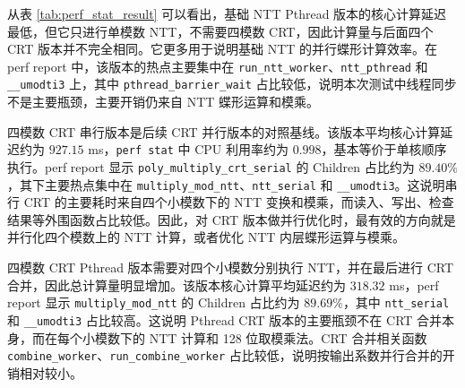 \documentclass[a4paper]{article}
\begin{document}
\begin{table}[htbp]
  \centering
  \caption{串行与并行版本在大规模样例上的 perf 统计结果}
  \label{tab:perf_stat_result}
\end{table}

从表 \ref{tab:perf_stat_result} 可以看出，基础 NTT Pthread 版本的核心计算延迟最低，但它只进行单模数 NTT，不需要四模数 CRT，因此计算量与后面四个 CRT 版本并不完全相同。它更多用于说明基础 NTT 的并行蝶形计算效率。在 perf report 中，该版本的热点主要集中在 \texttt{run\_ntt\_worker}、\texttt{ntt\_pthread} 和 \texttt{\_\_umodti3} 上，其中 \texttt{pthread\_barrier\_wait} 占比较低，说明本次测试中线程同步不是主要瓶颈，主要开销仍来自 NTT 蝶形运算和模乘。

四模数 CRT 串行版本是后续 CRT 并行版本的对照基线。该版本平均核心计算延迟约为 $927.15$ ms，\texttt{perf stat} 中 CPU 利用率约为 $0.998$，基本等价于单核顺序执行。perf report 显示 \texttt{poly\_multiply\_crt\_serial} 的 Children 占比约为 $89.40\%$，其下主要热点集中在 \texttt{multiply\_mod\_ntt}、\texttt{ntt\_serial} 和 \texttt{\_\_umodti3}。这说明串行 CRT 的主要耗时来自四个小模数下的 NTT 变换和模乘，而读入、写出、检查结果等外围函数占比较低。因此，对 CRT 版本做并行优化时，最有效的方向就是并行化四个模数上的 NTT 计算，或者优化 NTT 内层蝶形运算与模乘。

四模数 CRT Pthread 版本需要对四个小模数分别执行 NTT，并在最后进行 CRT 合并，因此总计算量明显增加。该版本核心计算平均延迟约为 $318.32$ ms，perf report 显示 \texttt{multiply\_mod\_ntt} 的 Children 占比约为 $89.69\%$，其中 \texttt{ntt\_serial} 和 \texttt{\_\_umodti3} 占比较高。这说明 Pthread CRT 版本的主要瓶颈不在 CRT 合并本身，而在每个小模数下的 NTT 计算和 128 位取模乘法。CRT 合并相关函数 \texttt{combine\_worker}、\texttt{run\_combine\_worker} 占比较低，说明按输出系数并行合并的开销相对较小。
\end{document}
